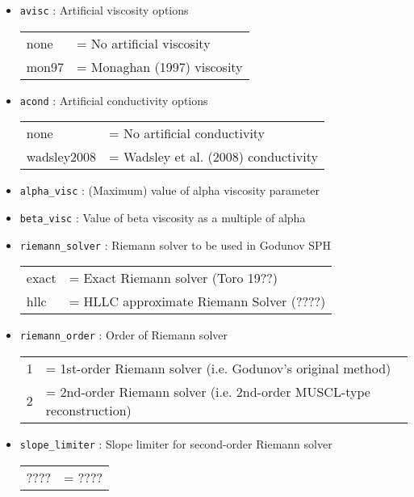 \documentclass[a4paper]{article}
\newcommand{\var}[1]{\texttt{#1}}
\begin{document}
\begin{itemize}


\item \var{avisc} : Artificial viscosity options \\
\begin{tabular}{ll}
none  & = No artificial viscosity \\
mon97 & = Monaghan (1997) viscosity
\end{tabular}

\item \var{acond} : Artificial conductivity options \\
\begin{tabular}{ll}
none        & = No artificial conductivity \\
wadsley2008 & = Wadsley et al. (2008) conductivity
\end{tabular}

\item \var{alpha\_visc} : (Maximum) value of alpha viscosity parameter

\item \var{beta\_visc} : Value of beta viscosity as a multiple of alpha


\item \var{riemann\_solver} : Riemann solver to be used in Godunov SPH \\
\begin{tabular}{ll}
exact  & = Exact Riemann solver (Toro 19??) \\
hllc   & = HLLC approximate Riemann Solver (????)
\end{tabular}

\item \var{riemann\_order} : Order of Riemann solver \\
\begin{tabular}{ll}
1  & = 1st-order Riemann solver (i.e. Godunov's original method) \\
2  & = 2nd-order Riemann solver (i.e. 2nd-order MUSCL-type reconstruction)
\end{tabular}

\item \var{slope\_limiter} : Slope limiter for second-order Riemann solver \\
\begin{tabular}{ll}
????     & = ???? \\
\end{tabular}




\end{itemize}
\end{document}
